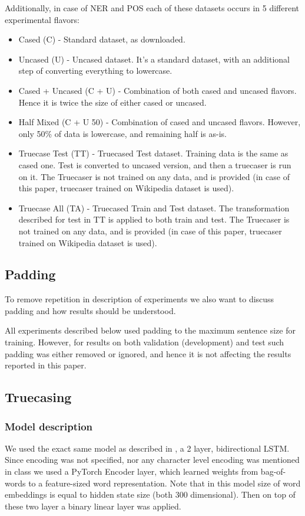\documentclass[11pt,a4paper]{article}
\begin{document}
Additionally, in case of NER and POS each of these datasets occurs in 5 different experimental flavors:
\begin{itemize}
    \item Cased (C) - Standard dataset, as downloaded.
    \item Uncased (U) - Uncased dataset. It's a standard dataset, with an additional step of converting everything to lowercase.
    \item Cased + Uncased (C + U) - Combination of both cased and uncased flavors. Hence it is twice the size of either cased or uncased.
    \item Half Mixed (C + U 50) - Combination of cased and uncased flavors. However, only 50\% of data is lowercase, and remaining half is as-is.
    \item Truecase Test (TT) - Truecased Test dataset. Training data is the same as cased one. Test is converted to uncased version, and then a truecaser is run on it. The Truecaser is not trained on any data, and is provided (in case of this paper, truecaser trained on Wikipedia dataset is used).
    \item Truecase All (TA) - Truecased Train and Test dataset. The transformation described for test in TT is applied to both train and test. The Truecaser is not trained on any data, and is provided (in case of this paper, truecaser trained on Wikipedia dataset is used).
\end{itemize}

\subsection{Padding}
To remove repetition in description of experiments we also want to discuss padding and how results should be understood.

All experiments described below used padding to the maximum sentence size for training. However, for results on both validation (development) and test such padding was either removed or ignored, and hence it is not affecting the results reported in this paper.

\subsection{Truecasing}
\label{sec:exp-truecase}

    \subsubsection{Model description}
    We used the exact same model as described in \cite{susanto-etal-2016-learning}, a 2 layer, bidirectional LSTM. Since encoding was not specified, nor any character level encoding was mentioned in class we used a PyTorch \cite{pytorch} Encoder layer, which learned weights from bag-of-words to a feature-sized word representation. Note that in this model size of word embeddings is equal to hidden state size (both 300 dimensional). Then on top of these two layer a binary linear layer was applied.
\end{document}
